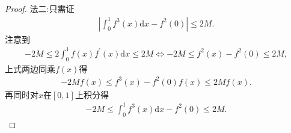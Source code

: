 \documentclass[../../main.tex]{subfiles}%
\begin{document}
\begin{proof}
{\color{blue}法二:}只需证
\begin{align*}
\left| \int_0^1{f^3\left( x \right) \mathrm{d}x}-f^2\left( 0 \right) \right|\leqslant 2M.
\end{align*}
注意到
\begin{align*}
-2M\leqslant 2\int_0^1{f\left( x \right) f^\prime \left( x \right) \mathrm{d}x}\leqslant 2M\Longleftrightarrow -2M\leqslant f^2\left( x \right) -f^2\left( 0 \right) \leqslant 2M,
\end{align*}
上式两边同乘$f\left( x \right)$得
\begin{align*}
-2Mf\left( x \right) \leqslant f^3\left( x \right) -f^2\left( 0 \right) f\left( x \right) \leqslant 2Mf\left( x \right).
\end{align*}
再同时对$x$在$\left[ 0,1 \right]$上积分得
\begin{align*}
-2M\leqslant \int_0^1{f^3\left( x \right) \mathrm{d}x}-f^2\left( 0 \right) \leqslant 2M.
\end{align*}
\end{proof}
\end{document}
